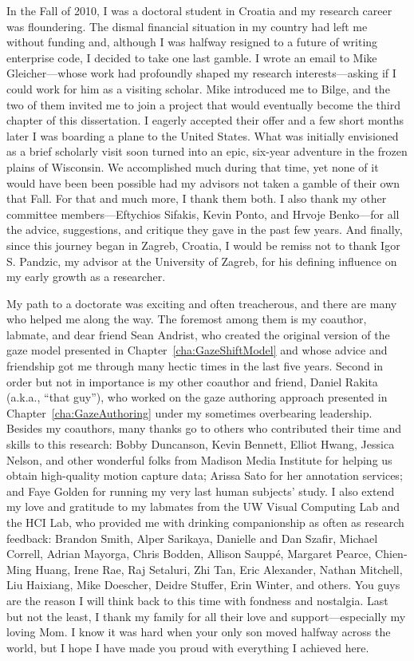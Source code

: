 In the Fall of 2010, I was a doctoral student in Croatia and my research career was floundering. The dismal financial situation in my country had left me without funding and, although I was halfway resigned to a future of writing enterprise code, I decided to take one last gamble. I wrote an email to Mike Gleicher---whose work had profoundly shaped my research interests---asking if I could work for him as a visiting scholar. Mike introduced me to Bilge, and the two of them invited me to join a project that would eventually become the third chapter of this dissertation. I eagerly accepted their offer and a few short months later I was boarding a plane to the United States. What was initially envisioned as a brief scholarly visit soon turned into an epic, six-year adventure in the frozen plains of Wisconsin. We accomplished much during that time, yet none of it would have been been possible had my advisors not taken a gamble of their own that Fall. For that and much more, I thank them both. I also thank my other committee members---Eftychios Sifakis, Kevin Ponto, and Hrvoje Benko---for all the advice, suggestions, and critique they gave in the past few years. And finally, since this journey began in Zagreb, Croatia, I would be remiss not to thank Igor S. Pandzic, my advisor at the University of Zagreb, for his defining influence on my early growth as a researcher.

My path to a doctorate was exciting and often treacherous, and there are many who helped me along the way. The foremost among them is my coauthor, labmate, and dear friend Sean Andrist, who created the original version of the gaze model presented in Chapter~\ref{cha:GazeShiftModel} and whose advice and friendship got me through many hectic times in the last five years. Second in order but not in importance is my other coauthor and friend, Daniel Rakita (a.k.a., ``that guy''), who worked on the gaze authoring approach presented in Chapter~\ref{cha:GazeAuthoring} under my sometimes overbearing leadership. Besides my coauthors, many thanks go to others who contributed their time and skills to this research: Bobby Duncanson, Kevin Bennett, Elliot Hwang, Jessica Nelson, and other wonderful folks from Madison Media Institute for helping us obtain high-quality motion capture data; Arissa Sato for her annotation services; and Faye Golden for running my very last human subjects' study. I also extend my love and gratitude to my labmates from the UW Visual Computing Lab and the HCI Lab, who provided me with drinking companionship as often as research feedback: Brandon Smith, Alper Sarikaya, Danielle and Dan Szafir, Michael Correll, Adrian Mayorga, Chris Bodden, Allison Saupp\'{e}, Margaret Pearce, Chien-Ming Huang, Irene Rae, Raj Setaluri, Zhi Tan, Eric Alexander, Nathan Mitchell, Liu Haixiang, Mike Doescher, Deidre Stuffer, Erin Winter, and others. You guys are the reason I will think back to this time with fondness and nostalgia. Last but not the least, I thank my family for all their love and support---especially my loving Mom. I know it was hard when your only son moved halfway across the world, but I hope I have made you proud with everything I achieved here. 